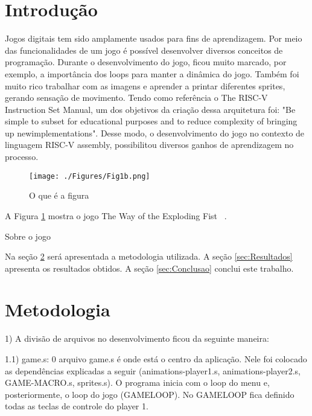 \documentclass[a4paper]{sbgames}
\begin{document}


\section{Introdução}
\label{sec:introducao}


Jogos digitais tem sido amplamente usados para fins de aprendizagem. Por meio das funcionalidades de um jogo é possível desenvolver diversos conceitos de programação. Durante o desenvolvimento do jogo, ficou muito marcado, por exemplo, a importância dos loops para manter a dinâmica do jogo. Também foi muito rico trabalhar com as imagens e aprender a printar diferentes sprites, gerando sensação de movimento. Tendo como referência o The RISC-V Instruction Set Manual, um dos objetivos da criação dessa arquitetura foi: "Be simple to subset for educational purposes and to reduce complexity of bringing up newimplementations". Desse modo, o desenvolvimento do jogo no contexto de linguagem RISC-V assembly, possibilitou diversos ganhos de aprendizagem no processo.


\begin{figure}[htb]
  \begin{center}
   \texttt{[image: ./Figures/Fig1b.png]}
  \end{center}
  \caption{O que é a figura}
  \label{fig:01}
\end{figure}

A Figura \ref{fig:01} mostra o jogo The Way of the Exploding Fist  ~\cite{Alt}.

Sobre o jogo

Na seção \ref{sec:Metodologia} será apresentada a metodologia utilizada. A seção \ref{sec:Resultados} apresenta os resultados obtidos. A seção \ref{sec:Conclusao} conclui este trabalho.

\section{Metodologia}
\label{sec:Metodologia}

\setlength{\parindent}{4em}
\setlength{\parskip}{1em}


1) A divisão de arquivos no desenvolvimento ficou da seguinte maneira:

1.1) game.s: 0 arquivo game.s é onde está o centro da aplicação. Nele foi colocado as dependências explicadas a seguir (animations-player1.s, animations-player2.s, GAME-MACRO.s, sprites.s). O programa inicia com o loop do menu e, posteriormente, o loop do jogo (GAMELOOP). No GAMELOOP fica definido todas as teclas de controle do player 1.
	
\end{document}

